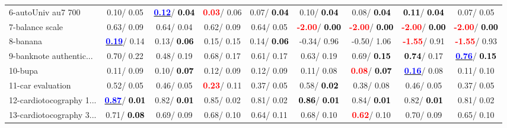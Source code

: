 \begin{table}[h]
\begin{center}
\begin{tabular}{lc|c|c|c|c|c|c|c}
6-autoUniv au7 700 &   0.10/  0.05 & \underline{\textcolor{blue}{\textbf{  0.12}}}/\textcolor{black}{\textbf{  0.04}} & \textcolor{red}{\textbf{  0.03}}/  0.06 &   0.07/\textcolor{black}{\textbf{  0.04}} &   0.10/\textcolor{black}{\textbf{  0.04}} &   0.08/\textcolor{black}{\textbf{  0.04}} & \textcolor{black}{\textbf{  0.11}}/\textcolor{black}{\textbf{  0.04}} &   0.07/  0.05 \\
7-balance scale &   0.63/  0.09 &   0.64/  0.04 &   0.62/  0.09 &   0.64/  0.05 & \textcolor{red}{\textbf{ -2.00}}/\textcolor{black}{\textbf{  0.00}} & \textcolor{red}{\textbf{ -2.00}}/\textcolor{black}{\textbf{  0.00}} & \textcolor{red}{\textbf{ -2.00}}/\textcolor{black}{\textbf{  0.00}} & \textcolor{red}{\textbf{ -2.00}}/\textcolor{black}{\textbf{  0.00}} \\ \hline
8-banana & \underline{\textcolor{blue}{\textbf{  0.19}}}/  0.14 &   0.13/\textcolor{black}{\textbf{  0.06}} &   0.15/  0.15 &   0.14/\textcolor{black}{\textbf{  0.06}} &  -0.34/  0.96 &  -0.50/  1.06 & \textcolor{red}{\textbf{ -1.55}}/  0.91 & \textcolor{red}{\textbf{ -1.55}}/  0.93 \\
9-banknote authentic... &   0.70/  0.22 &   0.48/  0.19 &   0.68/  0.17 &   0.61/  0.17 &   0.63/  0.19 &   0.69/\textcolor{black}{\textbf{  0.15}} & \textcolor{black}{\textbf{  0.74}}/  0.17 & \underline{\textcolor{blue}{\textbf{  0.76}}}/\textcolor{black}{\textbf{  0.15}} \\
10-bupa &   0.11/  0.09 &   0.10/\textcolor{black}{\textbf{  0.07}} &   0.12/  0.09 &   0.12/  0.09 &   0.11/  0.08 & \textcolor{red}{\textbf{  0.08}}/\textcolor{black}{\textbf{  0.07}} & \underline{\textcolor{blue}{\textbf{  0.16}}}/  0.08 &   0.11/  0.10 \\
11-car evaluation &   0.52/  0.05 &   0.46/  0.05 & \textcolor{red}{\textbf{  0.23}}/  0.11 &   0.37/  0.05 &   0.58/\textcolor{black}{\textbf{  0.02}} &   0.38/  0.08 &   0.46/  0.05 &   0.37/  0.05 \\
12-cardiotocography 1... & \underline{\textcolor{blue}{\textbf{  0.87}}}/\textcolor{black}{\textbf{  0.01}} &   0.82/\textcolor{black}{\textbf{  0.01}} &   0.85/  0.02 &   0.81/  0.02 & \textcolor{black}{\textbf{  0.86}}/\textcolor{black}{\textbf{  0.01}} &   0.84/\textcolor{black}{\textbf{  0.01}} &   0.82/\textcolor{black}{\textbf{  0.01}} &   0.81/  0.02 \\
13-cardiotocography 3... &   0.71/\textcolor{black}{\textbf{  0.08}} &   0.69/  0.09 &   0.68/  0.10 &   0.64/  0.11 &   0.68/  0.10 & \textcolor{red}{\textbf{  0.62}}/  0.10 &   0.70/  0.09 &   0.65/  0.10 \\

\end{tabular}
\end{center}
\end{table}
